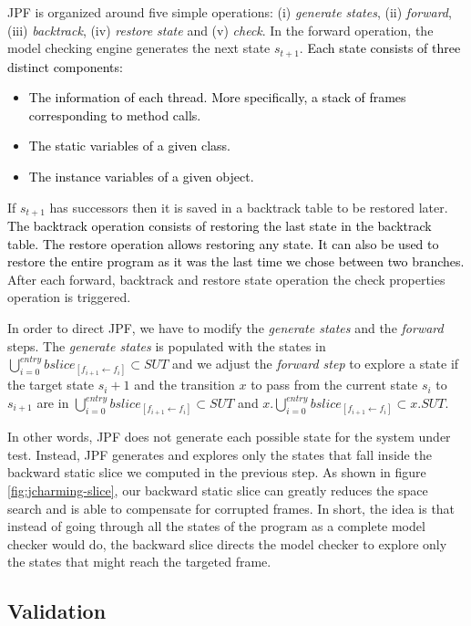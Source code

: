 \documentclass[times, doublespace]{smrauth}
\newcommand{\red}[1]{\textcolor{black}{#1}}
\begin{document}
{JPF is organized around five simple
operations: (i) {\it generate states}, (ii) {\it forward}, (iii) {\it backtrack},
(iv) {\it restore state} and (v) {\it check}.
In the forward operation, the
model checking engine generates the next state $s_{t+1}$.
\red{Each state consists of three distinct components: }
\begin{itemize}
  \item \red{The information of each thread. More specifically, a stack of frames corresponding to method calls.}
  \item \red{The static variables of a given class.}
  \item \red{The instance variables of a given object.}
\end{itemize}
If $s_{t+1}$ has successors then it is saved in a backtrack table to be
restored later. \red{The backtrack operation consists of restoring
the last state in the backtrack table. The restore operation
allows restoring any state. It can also be used to restore the entire
program as it was the last time we chose between two
branches.} After each forward, backtrack and restore state
operation the check properties operation is triggered.

In order to direct JPF, we have to modify the {\it generate states}
and the {\it forward} steps. The {\it generate states} is populated with
the states in $\bigcup_{i=0}^{entry} bslice_{[f_{i+1} \leftarrow f_i]}  \subset SUT$ and we adjust the
{\it forward step} to explore a state if the target state $s_i+1$ and the
transition $x$ to pass from the current state $s_i$ to $s_{i+1}$ are in
$\bigcup_{i=0}^{entry} bslice_{[f_{i+1} \leftarrow f_i]}  \subset SUT$ and $x.\bigcup_{i=0}^{entry} bslice_{[f_{i+1} \leftarrow f_i]}  \subset x.SUT$.

In other words, JPF does not generate each possible state for the system under test.
Instead, JPF generates and explores only the states that fall inside the backward static
slice we computed in the previous step.
As shown in figure \ref{fig:jcharming-slice}, our backward static slice can
greatly reduces the space search and is able to compensate for corrupted frames.
In short, the idea is that instead of going through all the states of the program as a
complete model checker would do, the backward slice directs the model checker to explore
only the states that might reach the targeted frame.

\subsection{Validation}

}
\end{document}
